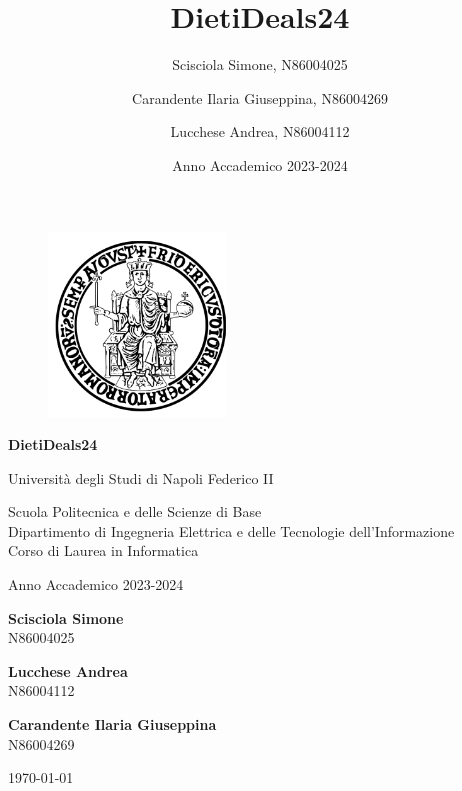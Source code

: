 \documentclass{report} %
\title{DietiDeals24}
\author{
    Scisciola Simone, N86004025
    \and
    Carandente Ilaria Giuseppina, N86004269
    \and
    Lucchese Andrea, N86004112
}
\date{Anno Accademico 2023-2024}
\begin{document}
    \begin{titlepage} %
    
        \begin{figure}[htbp!]
            \begin{center}
                \includegraphics[width=.30\textwidth]{Immagini/Logo/FedericoII.png}
            \end{center}
        \end{figure}
        
        \begin{center}
        
            \textbf{\LARGE DietiDeals24}
        
            \vspace{3\baselineskip}
            
            {\LARGE Università degli Studi di Napoli Federico II}         
            \vspace{1\baselineskip}
            
            {\large Scuola Politecnica e delle Scienze di Base \\
            Dipartimento di Ingegneria Elettrica e delle Tecnologie dell’Informazione \\
            Corso di Laurea in Informatica}
            \vspace{1\baselineskip}
            
            Anno Accademico 2023-2024
            \vspace{8\baselineskip}


            
            {\large \bfseries Scisciola Simone} \\
            N86004025
    	  \vspace{1\baselineskip}
    
            {\large \bfseries Lucchese Andrea} \\
            N86004112
    	  \vspace{1\baselineskip}
    
            {\large \bfseries Carandente Ilaria Giuseppina} \\
            N86004269
            \vspace{10\baselineskip}


    
    	  {\large \today}
       
        \end{center}
    \end{titlepage}
\end{document}
